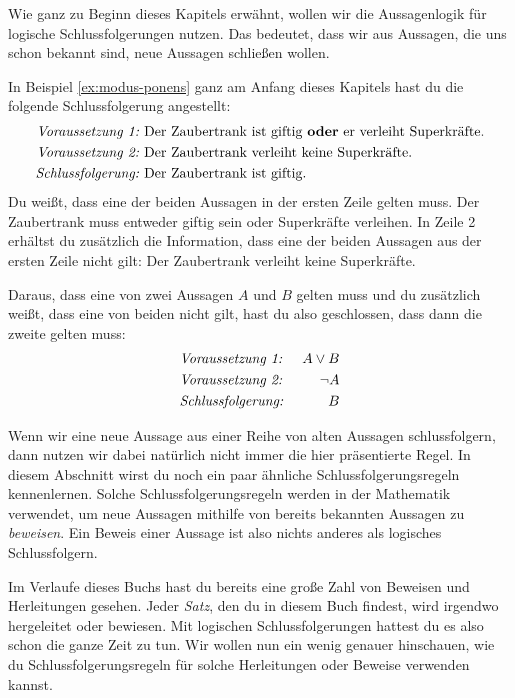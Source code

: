 \documentclass[../../main.tex]{subfiles}
\begin{document}
Wie ganz zu Beginn dieses Kapitels erwähnt, wollen wir die Aussagenlogik für logische Schlussfolgerungen nutzen. Das bedeutet, dass wir aus Aussagen, die uns schon bekannt sind, neue Aussagen schließen wollen. 

\begin{example}{}
    In Beispiel \ref{ex:modus-ponens} ganz am Anfang dieses Kapitels hast du die folgende Schlussfolgerung angestellt:
    \begin{align*}
        \text{\emph{Voraussetzung~1:}}~&\text{Der~Zaubertrank~ist~giftig~\textbf{oder}~er~verleiht~Superkräfte}.\\
        \text{\emph{Voraussetzung~2:}}~&\text{Der~Zaubertrank~verleiht~keine~Superkräfte}.\\
        \text{\emph{Schlussfolgerung:}}~&\text{Der~Zaubertrank~ist~giftig}.
    \end{align*}
    Du weißt, dass eine der beiden Aussagen in der ersten Zeile gelten muss. Der Zaubertrank muss entweder giftig sein oder Superkräfte verleihen. In Zeile 2 erhältst du zusätzlich die Information, dass eine der beiden Aussagen aus der ersten Zeile nicht gilt: Der Zaubertrank verleiht keine Superkräfte.
\end{example}

Daraus, dass eine von zwei Aussagen $A$ und $B$ gelten muss und du zusätzlich weißt, dass eine von beiden nicht gilt, hast du also geschlossen, dass dann die zweite gelten muss:
\begin{align*}
    &\text{\emph{Voraussetzung~1:}}~&A\lor B\\
    &\text{\emph{Voraussetzung~2:}}~&\lnot A\\
    &\text{\emph{Schlussfolgerung:}}~&B
\end{align*}

Wenn wir eine neue Aussage aus einer Reihe von alten Aussagen schlussfolgern, dann nutzen wir dabei natürlich nicht immer die hier präsentierte Regel. In diesem Abschnitt wirst du noch ein paar ähnliche Schlussfolgerungsregeln kennenlernen. Solche Schlussfolgerungsregeln werden in der Mathematik verwendet, um neue Aussagen mithilfe von bereits bekannten Aussagen zu \emph{beweisen}. Ein Beweis einer Aussage ist also nichts anderes als logisches Schlussfolgern.

Im Verlaufe dieses Buchs hast du bereits eine große Zahl von Beweisen und Herleitungen gesehen. Jeder \emph{Satz}, den du in diesem Buch findest, wird irgendwo hergeleitet oder bewiesen. Mit logischen Schlussfolgerungen hattest du es also schon die ganze Zeit zu tun. Wir wollen nun ein wenig genauer hinschauen, wie du Schlussfolgerungsregeln für solche Herleitungen oder Beweise verwenden kannst.
\end{document}
